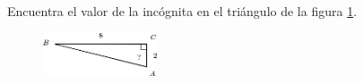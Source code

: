 Encuentra el valor de la incógnita en el triángulo de la figura \ref{fig:angle_functrig_27}.
\begin{figure}[H]
    \begin{center}
        \includegraphics[width=0.3\textwidth]{../images/angle_functrig_27.png}
    \end{center}
    \caption{}
    \label{fig:angle_functrig_27}
\end{figure}